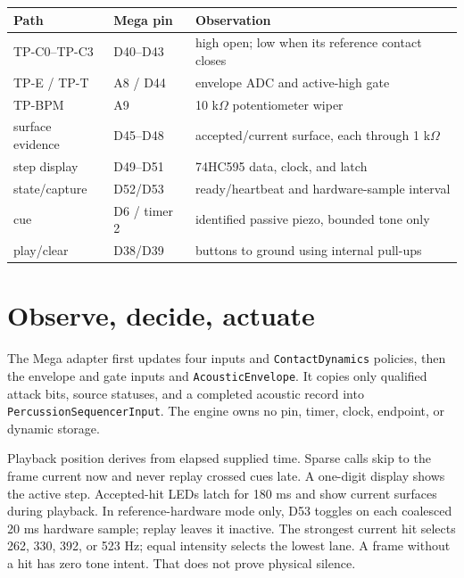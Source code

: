 \documentclass[11pt]{article}
\begin{document}
\begin{tabularx}{\linewidth}{@{}l l X@{}}
\toprule
Path & Mega pin & Observation\\
\midrule
TP-C0--TP-C3 & D40--D43 & high open; low when its reference contact closes\\
TP-E / TP-T & A8 / D44 & envelope ADC and active-high gate\\
TP-BPM & A9 & 10 k\(\Omega\) potentiometer wiper\\
surface evidence & D45--D48 & accepted/current surface, each through 1 k\(\Omega\)\\
step display & D49--D51 & 74HC595 data, clock, and latch\\
state/capture & D52/D53 & ready/heartbeat and hardware-sample interval\\
cue & D6 / timer 2 & identified passive piezo, bounded tone only\\
play/clear & D38/D39 & buttons to ground using internal pull-ups\\
\bottomrule
\end{tabularx}

\section{Observe, decide, actuate}
The Mega adapter first updates four inputs and \texttt{ContactDynamics}
policies, then the envelope and gate inputs and \texttt{AcousticEnvelope}.
It copies only qualified attack bits, source statuses, and a completed
acoustic record into \texttt{PercussionSequencerInput}. The engine owns no
pin, timer, clock, endpoint, or dynamic storage.

Playback position derives from elapsed supplied time. Sparse calls skip to the
frame current now and never replay crossed cues late. A one-digit display
shows the active step. Accepted-hit LEDs latch for 180 ms and show current
surfaces during playback. In reference-hardware mode only, D53 toggles on each
coalesced 20 ms hardware sample; replay leaves it inactive.
The strongest current hit selects 262, 330, 392, or 523 Hz; equal intensity
selects the lowest lane. A frame without a hit has zero tone intent. That does
not prove physical silence.
\end{document}
